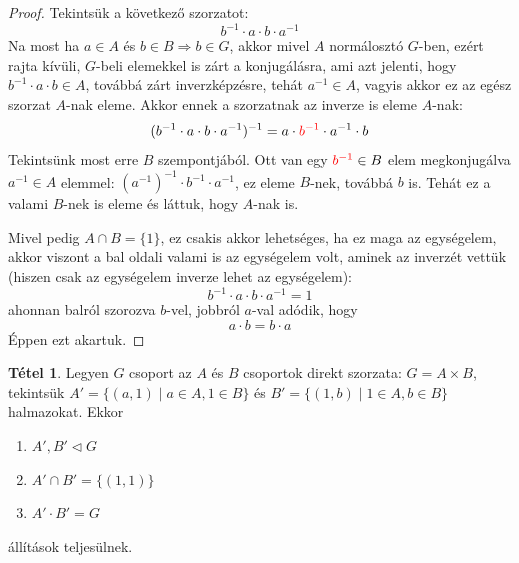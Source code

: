 \documentclass[12pt]{book}
\theoremstyle{plain} %
\theoremstyle{definition} %
\newtheorem{theo/}{Tétel}[section]
\newenvironment{theo}
  {\renewcommand{\qedsymbol}{$\clubsuit$}%
   \pushQED{\qed}\begin{theo/}}
  {\popQED\end{theo/}}
\theoremstyle{remark}
\renewcommand\qedsymbol{$\blacksquare$}
\numberwithin{equation}{section}  %
\begin{document}
	\begin{proof}
		Tekintsük a következő szorzatot:
		\[ b^{-1} \cdot a\cdot b \cdot a^{-1}  \]
		Na most ha $a\in A$ és $b\in B \Rightarrow b\in G$, akkor mivel $A$ normálosztó $G$-ben, ezért  rajta kívüli, $G$-beli elemekkel is zárt a konjugálásra, ami azt jelenti, hogy $b^{-1}\cdot a \cdot b\in A$, továbbá zárt inverzképzésre, tehát $a^{-1}\in A$, vagyis akkor ez az egész szorzat $A$-nak eleme. Akkor ennek a szorzatnak az inverze is eleme $A$-nak:
		\[ (b^{-1} \cdot a\cdot b \cdot a^{-1})^{-1} = a \cdot \color{red}b^{-1}\color{black} \cdot a^{-1} \cdot b \]
		Tekintsünk most erre $B$ szempontjából. Ott van egy $\color{red}b^{-1}\color{black}\in B$ elem megkonjugálva $a^{-1}\in A$ elemmel: $(a^{-1})^{-1} \cdot b^{-1} \cdot a^{-1} $, ez eleme $B$-nek, továbbá $b$ is. Tehát ez a valami $B$-nek is eleme és láttuk, hogy $A$-nak is.
		
		Mivel pedig $A\cap B = \{1\}$, ez csakis akkor lehetséges, ha ez maga az egységelem, akkor viszont a bal oldali valami is az egységelem volt, aminek az inverzét vettük (hiszen csak az egységelem inverze lehet az egységelem):
		\[ b^{-1}\cdot a \cdot b \cdot a^{-1} = 1 \]
		ahonnan balról szorozva $b$-vel, jobbról $a$-val adódik, hogy
		\[ a \cdot b = b\cdot a \]
		Éppen ezt akartuk.
	\end{proof}

	\begin{theo}
		Legyen $G$ csoport az $A$ és $B$ csoportok direkt szorzata: $G=A\times B$, tekintsük $A'=\{(a,1) \mid a\in A, 1\in B \}$ és $B'=\{(1,b) \mid 1\in A, b\in B  \}$ halmazokat. Ekkor
		\begin{enumerate}
			\item{$A',B' \triangleleft G$}
			\item{$A'\cap B' = \{(1,1)\}$}
			\item{$A' \cdot B' = G$}
		\end{enumerate}
		állítások teljesülnek.
	\end{theo}
\end{document}
